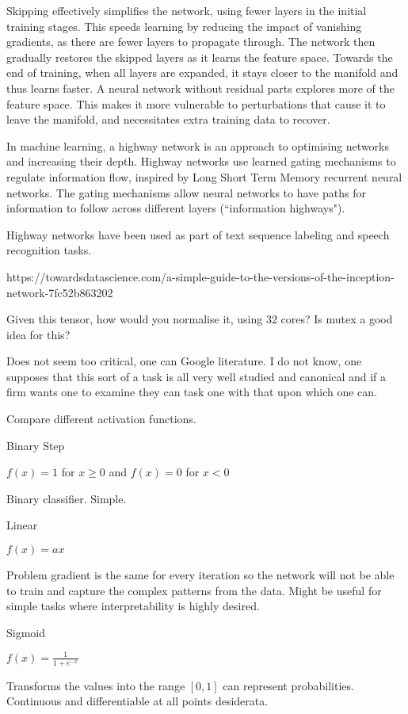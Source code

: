 Skipping effectively simplifies the network, using fewer layers in the initial training stages. This speeds learning by reducing the impact of vanishing gradients, as there are fewer layers to propagate through. The network then gradually restores the skipped layers as it learns the feature space. Towards the end of training, when all layers are expanded, it stays closer to the manifold and thus learns faster. A neural network without residual parts explores more of the feature space. This makes it more vulnerable to perturbations that cause it to leave the manifold, and necessitates extra training data to recover.

In machine learning, a highway network is an approach to optimising networks and increasing their depth. Highway networks use learned gating mechanisms to regulate information flow, inspired by Long Short Term Memory recurrent neural networks. The gating mechanisms allow neural networks to have paths for information to follow across different layers (``information highways").

Highway networks have been used as part of text sequence labeling and speech recognition tasks.

https://towardsdatascience.com/a-simple-guide-to-the-versions-of-the-inception-network-7fc52b863202

Given this tensor, how would you normalise it, using 32 cores? Is mutex a good idea for this?

Does not seem too critical, one can Google literature. I do not know, one supposes that this sort of a task is all very well studied and canonical and if a firm wants one to examine they can task one with that upon which one can.

Compare different activation functions.

Binary Step

$f(x) = 1$ for $x \ge 0$ and $f(x) = 0$ for $x<0$

Binary classifier. Simple.

Linear

$f(x) = ax$

Problem gradient is the same for every iteration so the network will not be able to train and capture the complex patterns from the data. Might be useful for simple tasks where interpretability is highly desired.

Sigmoid

$f(x) = \frac{1}{1+e^{-x}}$

Transforms the values into the range $[0,1]$ can represent probabilities. Continuous and differentiable at all points desiderata.

